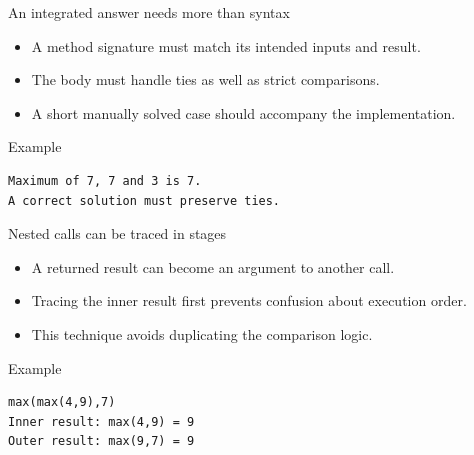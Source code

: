 \documentclass[10pt,aspectratio=169]{beamer}
\begin{document}
\begin{frame}[fragile,t]{An integrated answer needs more than syntax}
\begin{itemize}
\item A method signature must match its intended inputs and result.
\item The body must handle ties as well as strict comparisons.
\item A short manually solved case should accompany the implementation.
\end{itemize}
\vspace{1mm}\begin{block}{Example}
\begin{lstlisting}
Maximum of 7, 7 and 3 is 7.
A correct solution must preserve ties.
\end{lstlisting}
\end{block}
\end{frame}

\begin{frame}[fragile,t]{Nested calls can be traced in stages}
\begin{itemize}
\item A returned result can become an argument to another call.
\item Tracing the inner result first prevents confusion about execution order.
\item This technique avoids duplicating the comparison logic.
\end{itemize}
\vspace{1mm}\begin{block}{Example}
\begin{lstlisting}
max(max(4,9),7)
Inner result: max(4,9) = 9
Outer result: max(9,7) = 9
\end{lstlisting}
\end{block}
\end{frame}
\end{document}

